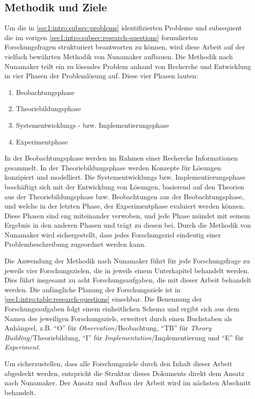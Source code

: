 \subsection{Methodik und Ziele}
\label{sec1:intro:subsec:methodology-goals}
Um die in \cref{sec1:intro:subsec:problems} identifizierten Probleme und subsequent die im vorigen \cref{sec1:intro:subsec:research-questions} formulierten Forschungsfragen strukturiert beantworten zu können, wird diese Arbeit auf der vielfach bewährten Methodik von Nunamaker \cite{nunamaker} aufbauen.
Die Methodik nach Nunamaker teilt ein zu lösendes Problem anhand von Recherche und Entwicklung in vier Phasen der Problemlösung auf.
\newline
Diese vier Phasen lauten:
\begin{enumerate}
    \setlength{\itemsep}{0pt}
    \item Beobachtungsphase
    \item Theoriebildungsphase
    \item Systementwicklungs - bzw. Implementierungsphase
    \item Experimentphase
\end{enumerate}

In der Beobachtungsphase werden im Rahmen einer Recherche Informationen gesammelt.
In der Theoriebildungsphase werden Konzepte für Lösungen konzipiert und modelliert.
Die Systementwicklungs bzw. Implementierungsphase beschäftigt sich mit der Entwicklung von Lösungen, basierend auf den Theorien aus der Theoriebildungsphase bzw. Beobachtungen aus der Beobachtungsphase, und welche in der letzten Phase, der Experimentphase evaluiert werden können.
Diese Phasen sind eng miteinander verwoben, und jede Phase mündet mit seinem Ergebnis in den anderen Phasen und trägt zu diesen bei.
Durch die Methodik von Nunamaker wird sichergestellt, dass jedes Forschungsziel eindeutig einer Problembeschreibung zugeordnet werden kann.

Die Anwendung der Methodik nach Nunamaker führt für jede Forschungsfrage zu jeweils vier Forschungszielen, die in jeweils einem Unterkapitel behandelt werden.
Dies führt insgesamt zu acht Forschungsaufgaben, die mit dieser Arbeit behandelt werden.
Die anfängliche Planung der Forschungsziele ist in \cref{sec1:intro:table:research-questions} einsehbar.
Die Benennung der Forschungsaufgaben folgt einem einheitlichen Schema und ergibt sich aus dem Namen des jeweiligen Forschungsziels, erweitert durch einen Buchstaben als Anhängsel, z.B. \enquote{O}
 für \textit{Observation}/Beobachtung, \enquote{TB} für \textit{Theory Building}/Theoriebildung, \enquote{I} für \textit{Implementation}/Implementierung und \enquote{E} für \textit{Experiment}.
 \clearpage

\noindent
Um sicherzustellen, dass alle Forschungsziele durch den Inhalt dieser Arbeit abgedeckt werden, entspricht die Struktur dieses Dokuments direkt dem Ansatz nach Nunamaker.
Der Ansatz und Aufbau der Arbeit wird im nächsten Abschnitt behandelt.

